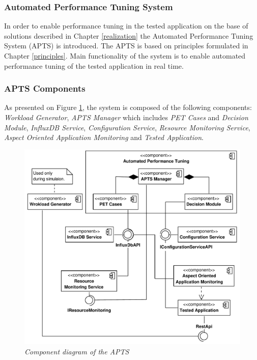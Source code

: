 \documentclass[10pt,a4paper]{article}
\begin{document}
\subsubsection{Automated Performance Tuning System}

In order to enable performance tuning in the tested application on the base of solutions described in Chapter \ref{realization} the Automated Performance Tuning System (APTS) is introduced. The APTS is based on principles formulated in Chapter \ref{principles}. Main functionality of the system is to enable automated  performance tuning of the tested application in real time. 

\subsubsection{APTS Components}

As presented on Figure \ref{componentapts}, the system is composed of the following components: \textit{Workload Generator}, \textit{APTS Manager} which includes \textit{PET Cases} and \textit{Decision Module}, \textit{InfluxDB Service}, \textit{Configuration Service}, \textit{Resource Monitoring Service}, \textit{Aspect Oriented Application Monitoring} and \textit{Tested Application}.

\begin{figure}[!htb]
\centering
\includegraphics[width=1\textwidth]{APTSComponentDiagram}
\caption{\textit{Component diagram of the APTS}}
\label{componentapts}
\end{figure}
\end{document}
